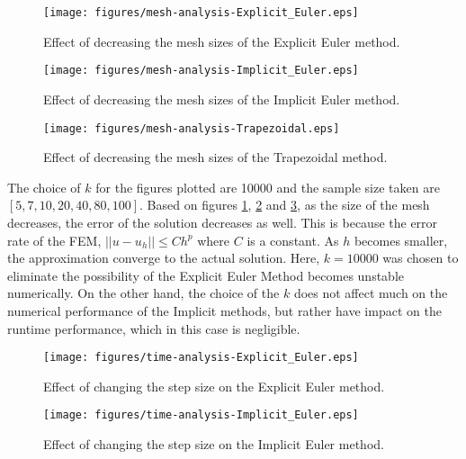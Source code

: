 \documentclass{article}
\begin{document}
\begin{figure}[H]
  \centering
  \texttt{[image: figures/mesh-analysis-Explicit\_Euler.eps]}
  \caption{Effect of decreasing the mesh sizes of the Explicit Euler method.}
  \label{fig:figures-mesh-analysis-Explicit_Euler-eps}
\end{figure}

\begin{figure}[H]
  \centering
  \texttt{[image: figures/mesh-analysis-Implicit\_Euler.eps]}
  \caption{Effect of decreasing the mesh sizes of the Implicit Euler method.}
  \label{fig:figures-mesh-analysis-Implicit_Euler-eps}
\end{figure}

\begin{figure}[H]
  \centering
  \texttt{[image: figures/mesh-analysis-Trapezoidal.eps]}
  \caption{Effect of decreasing the mesh sizes of the Trapezoidal method.}
  \label{fig:figures-mesh-analysis-Trapezoidal-eps}
\end{figure}
The choice of $k$ for the figures plotted are 10000 and the sample size taken are 
$[5, 7, 10, 20, 40, 80, 100]$. Based on figures \ref{fig:figures-mesh-analysis-Explicit_Euler-eps}, \ref{fig:figures-mesh-analysis-Implicit_Euler-eps} and \ref{fig:figures-mesh-analysis-Trapezoidal-eps},
as the size of the mesh decreases, the error of the solution decreases as well. This is because
the error rate of the FEM, $||u - u_h|| \le Ch^p$ where $C$ is a constant. As $h$ becomes 
smaller, the approximation converge to the actual solution. Here, $k=10000$ was chosen to 
eliminate the possibility of the Explicit Euler Method becomes unstable numerically. On the 
other hand, the choice of the $k$ does not affect much on the numerical performance of the 
Implicit methods, but rather have impact on the runtime performance, which in this case is 
negligible.



\begin{figure}[H]
  \centering
  \texttt{[image: figures/time-analysis-Explicit\_Euler.eps]}
  \caption{Effect of changing the step size on the Explicit Euler method.}
  \label{fig:figures-time-analysis-Explicit_Euler-eps}
\end{figure}

\begin{figure}[H]
  \centering
  \texttt{[image: figures/time-analysis-Implicit\_Euler.eps]}
  \caption{Effect of changing the step size on the Implicit Euler method.}
  \label{fig:figures-time-analysis-Implicit_Euler-eps}
\end{figure}
\end{document}
